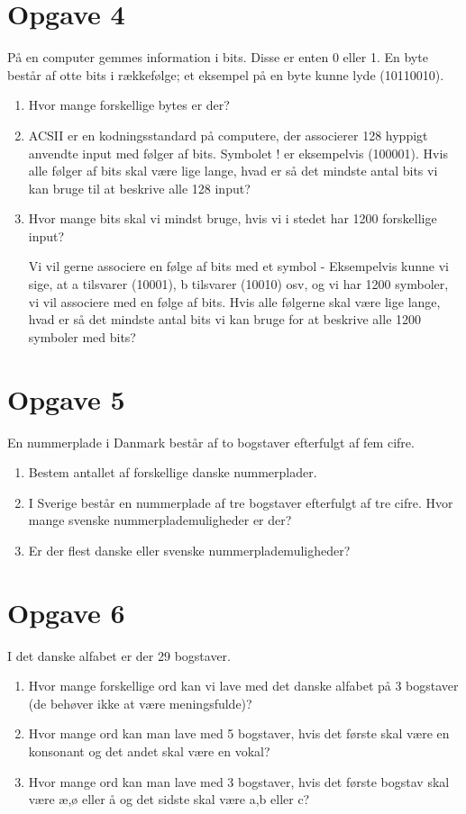 \section*{Opgave 4}
På en computer gemmes information i bits. Disse er enten 0 eller 1. En byte består af otte bits i rækkefølge; et eksempel på en byte kunne lyde (10110010).
\begin{enumerate}[label=\roman*)]
\item Hvor mange forskellige bytes er der?
\item ACSII er en kodningsstandard på computere, der associerer 128 hyppigt anvendte input med følger af bits. Symbolet ! er eksempelvis (100001). Hvis alle følger af bits skal være lige lange, hvad er så det mindste antal bits vi kan bruge til at beskrive alle 128 input? 
\item Hvor mange bits skal vi mindst bruge, hvis vi i stedet har 1200 forskellige input?

Vi vil gerne associere en følge af bits med et symbol - Eksempelvis kunne vi sige, at a tilsvarer (10001), b tilsvarer (10010) osv, og vi har 1200 symboler, vi vil associere med en følge af bits. Hvis alle følgerne skal være lige lange, hvad er så det mindste antal bits vi kan bruge for at beskrive alle 1200 symboler med bits?
\end{enumerate}

\section*{Opgave 5}
En nummerplade i Danmark består af to bogstaver efterfulgt af fem cifre. 
\begin{enumerate}[label=\roman*)]
\item Bestem antallet af forskellige danske nummerplader.
\item I Sverige består en nummerplade af tre bogstaver efterfulgt af tre cifre. Hvor mange svenske nummerplademuligheder er der?
\item Er der flest danske eller svenske nummerplademuligheder?
\end{enumerate}

\section*{Opgave 6}
I det danske alfabet er der 29 bogstaver. 
\begin{enumerate}[label=\roman*)]
	\item Hvor mange forskellige ord kan vi lave med det danske alfabet på 3 bogstaver (de behøver ikke at være meningsfulde)?
	\item Hvor mange ord kan man lave med 5 bogstaver, hvis det første skal være en konsonant og det andet skal være en vokal?
	\item Hvor mange ord kan man lave med 3 bogstaver, hvis det første bogstav skal være æ,ø eller å og det sidste skal være a,b eller c?
\end{enumerate}

